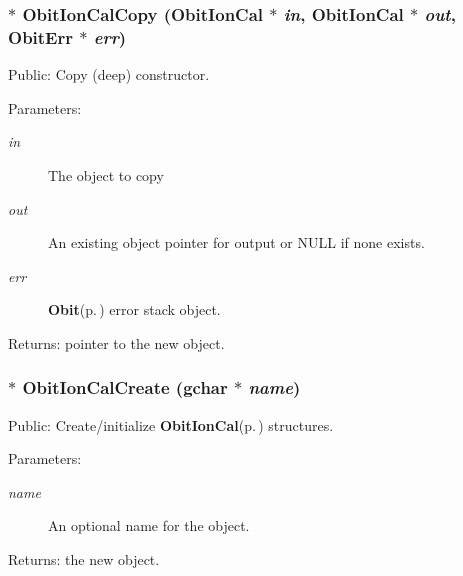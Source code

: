 \subsubsection{$\ast$ Obit\-Ion\-Cal\-Copy ({\bf Obit\-Ion\-Cal} $\ast$ {\em in}, {\bf Obit\-Ion\-Cal} $\ast$ {\em out}, {\bf Obit\-Err} $\ast$ {\em err})}\label{ObitIonCal_8c_a42}


Public: Copy (deep) constructor. 

\begin{Desc}
\item[Parameters:]
\begin{description}
\item[{\em in}]The object to copy \item[{\em out}]An existing object pointer for output or NULL if none exists. \item[{\em err}]{\bf Obit}{\rm (p.\,\pageref{structObit})} error stack object. \end{description}
\end{Desc}
\begin{Desc}
\item[Returns:]pointer to the new object. \end{Desc}
\subsubsection{$\ast$ Obit\-Ion\-Cal\-Create (gchar $\ast$ {\em name})}\label{ObitIonCal_8c_a44}


Public: Create/initialize {\bf Obit\-Ion\-Cal}{\rm (p.\,\pageref{structObitIonCal})} structures. 

\begin{Desc}
\item[Parameters:]
\begin{description}
\item[{\em name}]An optional name for the object. \end{description}
\end{Desc}
\begin{Desc}
\item[Returns:]the new object. \end{Desc}
